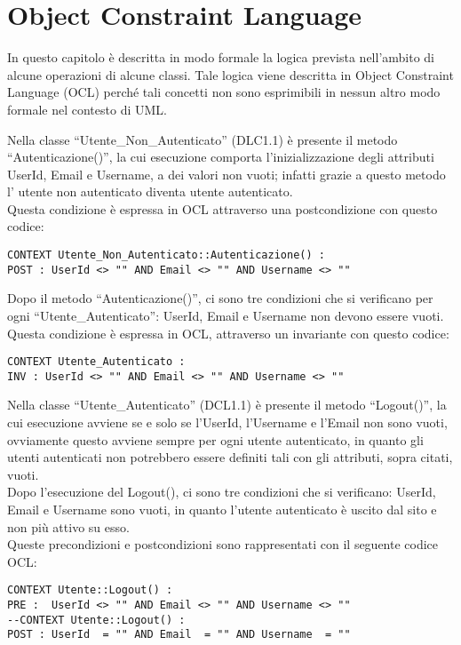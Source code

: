 \section{Object Constraint Language}
\label{secD3:ObjectConstraintLanguage}

In questo capitolo è descritta in modo formale la logica prevista nell'ambito di alcune operazioni di alcune classi. Tale logica viene descritta in Object Constraint Language (OCL) perché tali concetti non sono esprimibili in nessun altro modo formale nel contesto di UML.


\begin{listaPersonale}[OCL]{}
    Nella classe “Utente\_Non\_Autenticato” (DLC1.1) è presente il metodo “Autenticazione()”, la cui esecuzione comporta l’inizializzazione degli attributi UserId, Email e Username, a dei valori non vuoti; infatti grazie a questo metodo l’ utente non autenticato diventa utente autenticato. \\
    Questa condizione è espressa in OCL attraverso una postcondizione con questo codice:
    \begin{lstlisting}
CONTEXT Utente_Non_Autenticato::Autenticazione() : 
POST : UserId <> "" AND Email <> "" AND Username <> ""
    \end{lstlisting}
    Dopo il metodo “Autenticazione()”, ci sono tre condizioni che si verificano per ogni “Utente\_Autenticato”: UserId, Email e Username non devono essere vuoti. \\ Questa condizione è espressa in OCL, attraverso un invariante con questo codice:
    \begin{lstlisting}
CONTEXT Utente_Autenticato : 
INV : UserId <> "" AND Email <> "" AND Username <> ""
    \end{lstlisting}
    Nella classe “Utente\_Autenticato” (DCL1.1) è presente il metodo “Logout()”, la cui esecuzione avviene se e solo se l’UserId, l’Username e l’Email non sono vuoti, ovviamente questo avviene sempre per ogni utente autenticato, in quanto gli utenti autenticati non potrebbero essere definiti tali con gli attributi, sopra citati, vuoti. \\ 
    Dopo l’esecuzione del Logout(), ci sono tre condizioni che si verificano: UserId, Email e Username sono vuoti, in quanto l’utente autenticato è uscito dal sito e non più attivo su esso. \\ 
    Queste precondizioni e postcondizioni sono rappresentati con il seguente codice OCL:
    \begin{lstlisting}
CONTEXT Utente::Logout() : 
PRE :  UserId <> "" AND Email <> "" AND Username <> ""
--CONTEXT Utente::Logout() : 
POST : UserId  = "" AND Email  = "" AND Username  = ""
    \end{lstlisting}




\end{listaPersonale}
